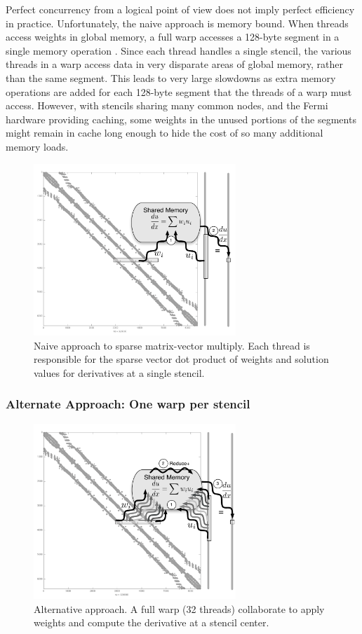 Perfect concurrency from a logical point of view does not 
imply perfect efficiency in practice. 
Unfortunately, the naive approach 
is memory bound. When threads access weights in global memory, 
a full warp accesses a 128-byte segment in a single memory operation \cite{CudaGuide2011}.
Since each thread handles a single stencil, the various threads in a warp access data in very disparate areas of global memory, rather than the same segment. This leads to very large slowdowns as extra memory operations are added for each 128-byte segment that the threads of a warp must access.
However, with stencils sharing many common nodes, and the Fermi hardware providing caching, some weights in the unused portions of the segments might remain in cache long enough to hide the cost of so many additional memory loads. 



\begin{figure}[htbp]
      \centering
       \includegraphics[width=3in]{figures/paper1/figures/omnigraffle/oneThreadPerStencil_GRAY.pdf}
      \caption{Naive approach to sparse matrix-vector multiply. Each thread is responsible for the sparse vector dot product of weights and solution values for derivatives at a single stencil.  }
      \label{fig:oneThreadPerStencil}
\end{figure}


\subsubsection{Alternate Approach: One warp per stencil} 

\begin{figure}[htbp]
      \centering
       \includegraphics[width=3in]{figures/paper1/figures/omnigraffle/oneWarpPerStencil_GRAY.pdf}
      \caption{Alternative approach. A full warp (32 threads) collaborate to apply weights  and compute the derivative at a stencil center. }
      \label{fig:oneWarpPerStencil}
\end{figure}


